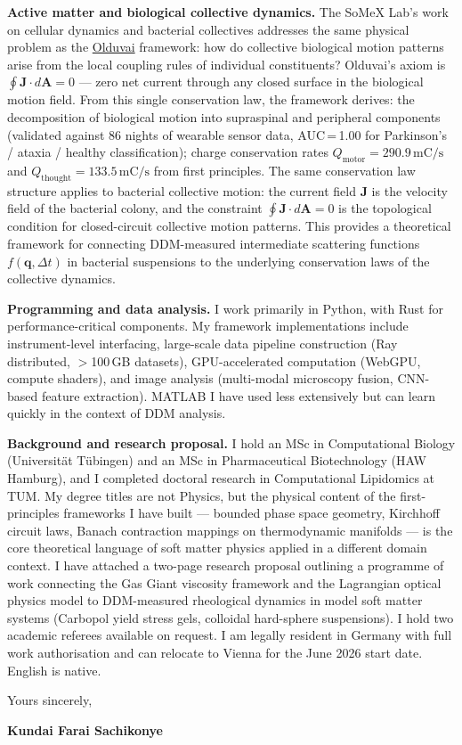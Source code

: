 \documentclass[12pt,a4paper]{article}
\begin{document}
\textbf{Active matter and biological collective dynamics.}
The SoMeX Lab's work on cellular dynamics and bacterial collectives addresses
the same physical problem as the
\href{https://github.com/fullscreen-triangle/olduvai}{Olduvai} framework:
how do collective biological motion patterns arise from the local coupling
rules of individual constituents?
Olduvai's axiom is $\oint \mathbf{J}\cdot d\mathbf{A} = 0$ --- zero net
current through any closed surface in the biological motion field.
From this single conservation law, the framework derives: the decomposition
of biological motion into supraspinal and peripheral components (validated
against 86 nights of wearable sensor data, AUC\,=\,1.00 for Parkinson's /
ataxia / healthy classification); charge conservation rates $Q_\mathrm{motor}
= 290.9\,\mathrm{mC/s}$ and $Q_\mathrm{thought} = 133.5\,\mathrm{mC/s}$
from first principles.
The same conservation law structure applies to bacterial collective motion:
the current field $\mathbf{J}$ is the velocity field of the bacterial colony,
and the constraint $\oint \mathbf{J}\cdot d\mathbf{A} = 0$ is the topological
condition for closed-circuit collective motion patterns.
This provides a theoretical framework for connecting DDM-measured intermediate
scattering functions $f(\mathbf{q}, \Delta t)$ in bacterial suspensions to
the underlying conservation laws of the collective dynamics.

\textbf{Programming and data analysis.}
I work primarily in Python, with Rust for performance-critical components.
My framework implementations include instrument-level interfacing, large-scale
data pipeline construction (Ray distributed, $>$100\,GB datasets),
GPU-accelerated computation (WebGPU, compute shaders), and image analysis
(multi-modal microscopy fusion, CNN-based feature extraction).
MATLAB I have used less extensively but can learn quickly in the context
of DDM analysis.

\textbf{Background and research proposal.}
I hold an MSc in Computational Biology (Universität Tübingen) and an MSc
in Pharmaceutical Biotechnology (HAW Hamburg), and I completed doctoral
research in Computational Lipidomics at TUM. My degree titles are not
Physics, but the physical content of the first-principles frameworks I have
built --- bounded phase space geometry, Kirchhoff circuit laws, Banach
contraction mappings on thermodynamic manifolds --- is the core theoretical
language of soft matter physics applied in a different domain context.
I have attached a two-page research proposal outlining a programme of
work connecting the Gas Giant viscosity framework and the Lagrangian optical
physics model to DDM-measured rheological dynamics in model soft matter
systems (Carbopol yield stress gels, colloidal hard-sphere suspensions).
I hold two academic referees available on request.
I am legally resident in Germany with full work authorisation and can
relocate to Vienna for the June 2026 start date.
English is native.

\vspace{1.5em}
Yours sincerely,

\vspace{2.5em}
\textbf{Kundai Farai Sachikonye}
\end{document}
